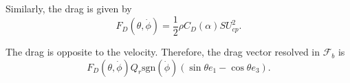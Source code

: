 \documentclass[10pt]{article}
\begin{document}
Similarly, the drag is given by
\[
    F_D(\theta,\dot\phi) = \frac{1}{2}\rho  C_D(\alpha) S U_{cp}^2.
\]

The drag is opposite to the velocity.
Therefore, the drag vector resolved in $\mathcal{F}_b$ is
\[
    F_D(\theta,\dot\phi)  Q_r \mathrm{sgn}(\dot\phi) (\sin\theta e_1 -\cos\theta e_3).
\]



\end{document}

